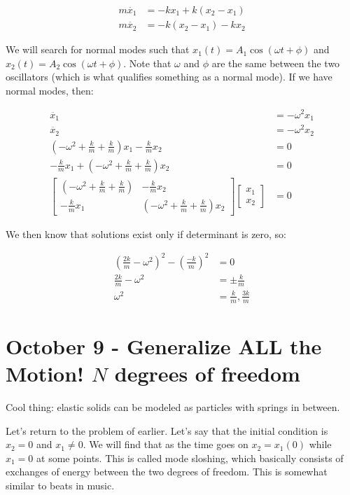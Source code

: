 \documentclass{report}
\begin{document}
\begin{align*}
m \ddot{x_1} &= -kx_1 + k(x_2 - x_1)\\
m \ddot{x_2} &= -k(x_2 - x_1) - kx_2
\end{align*}

We will search for normal modes such that $x_1(t) = A_1 \cos(\omega t + \phi)$ and $x_2(t) = A_2 \cos(\omega t + \phi)$. Note that $\omega$ and $\phi$ are the same between the two oscillators (which is what qualifies something as a normal mode). If we have normal modes, then:

\begin{align*}
\ddot{x_1} &= -\omega^2 x_1\\
\ddot{x_2} &= -\omega^2 x_2\\
(-\omega^2 + \frac{k}{m} + \frac{k}{m})x_1 - \frac{k}{m} x_2 &= 0\\
-\frac{k}{m} x_1 + (-\omega^2 + \frac{k}{m} + \frac{k}{m}) x_2&= 0\\
\begin{bmatrix}
(-\omega^2 + \frac{k}{m} + \frac{k}{m}) &  - \frac{k}{m} x_2\\
-\frac{k}{m} x_1 & (-\omega^2 + \frac{k}{m} + \frac{k}{m}) x_2
\end{bmatrix}\begin{bmatrix} x_1\\
x_2
\end{bmatrix} &= 0
\end{align*}

We then know that solutions exist only if determinant is zero, so:

\begin{align*}
(\frac{2k}{m} - \omega^2)^2 - (\frac{-k}{m})^2 &= 0\\
\frac{2k}{m} - \omega^2 &= \pm \frac{k}{m}\\
\omega^2 &= \frac{k}{m}, \frac{3k}{m}
\end{align*}

\chapter{October 9 - Generalize ALL the Motion! $N$ degrees of freedom}

Cool thing: elastic solids can be modeled as particles with springs in between.

Let's return to the problem of earlier. Let's say that the initial condition is $x_2 = 0$ and $x_1 \neq 0$. We will find that as the time goes on $x_2 = x_1(0)$ while $x_1 = 0$ at some points. This is called mode sloshing, which basically consists of exchanges of energy between the two degrees of freedom. This is somewhat similar to beats in music.
\end{document}
